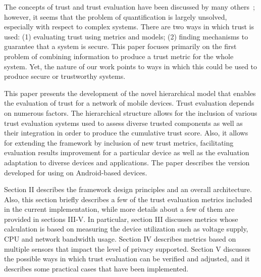 The concepts of trust and trust evaluation have been discussed by many others~\cite{};
however, it seems that the problem  of quantification is largely unsolved, especially with respect to complex systems.
There are two ways in which trust is used: (1) evaluating trust using metrics and models; (2) finding mechanisms to
guarantee that a system is secure.
This paper focuses primarily on the first problem of combining
information to produce a trust metric for the whole system.  Yet, the nature of our work points to ways in which 
this could be used to produce secure or trustworthy systems.  

This paper presents the development of the novel hierarchical model that enables the  evaluation of trust for a network of 
mobile devices. Trust evaluation depends on numerous factors. The hierarchical structure allows for the
inclusion of various trust evaluation systems used to assess diverse trusted components as well as their integration in 
order to produce the cumulative trust score. Also, it allows for extending the framework by inclusion of new trust metrics, 
facilitating evaluation results improvement for a particular device as well as the evaluation 
adaptation to diverse devices and applications. 
The paper describes the version developed for using on Android-based devices.

Section II describes the framework design principles and an overall architecture. Also, this section 
 briefly describes a few of the trust evaluation metrics included in the current implementation,
while more details about a few of them are provided in sections III-V. In particular, section III discusses metrics whose 
calculation is based on measuring the device utilization such as voltage supply, CPU and network bandwidth usage. 
Section IV describes metrics based on multiple sensors that impact the level of privacy supported. 
Section V discusses the possible ways in which trust evaluation can be verified and adjusted, and it 
describes some practical cases that have been implemented.
